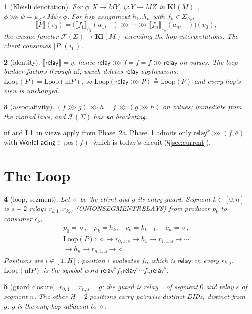 \documentclass[journal]{IEEEtran}
\newcommand{\namedhead}{}
\newtheorem*{namedenv}{\namedhead}
\newenvironment{defD}[2]{\renewcommand{\namedhead}{Definition #1}%
  \begin{namedenv}[#2]}{\end{namedenv}}
\newenvironment{lawL}[2]{\renewcommand{\namedhead}{Law #1}%
  \begin{namedenv}[#2]}{\end{namedenv}}
\newcommand{\sem}[1]{\llbracket #1\rrbracket}
\newcommand{\then}{\mathbin{\ggg}}
\newcommand{\relay}{\mathsf{relay}}
\newcommand{\WF}{\mathsf{WorldFacing}}
\newcommand{\Kl}{\mathbf{Kl}}
\newcommand{\Free}{\mathcal{F}}
\newcommand{\cl}{\diamond}
\newcommand{\nf}{\mathrm{nf}}
\newcommand{\LoopOf}{\mathrm{Loop}}
\newcommand{\pos}{\mathrm{pos}}
\newcommand{\eqd}{\overset{d}{=}}
\DeclareRobustCommand{\code}[1]{{\ttfamily\renewcommand{\_}{\textunderscore\allowbreak}#1}}
\begin{document}
\begin{defD}{D4b}{Kleisli denotation}
For $\phi:X\to MY$, $\psi:Y\to MZ$ in $\Kl(M)$~\cite{Moggi1991},
$\phi\then\psi=\mu_Z\circ M\psi\circ\phi$.  For hop assignment
$h_1..h_n$ with $f_k\in\Sigma_{h_k}$,
\[
\sem{P}(v_0)=\bigl(\sem{f_1}_{h_1}(\bar a_1,-)\then\cdots\then
\sem{f_n}_{h_n}(\bar a_n,-)\bigr)(v_0),
\]
the unique functor $\Free(\Sigma)\to\Kl(M)$ extending the hop
interpretations.  The client consumes $\sem{P}(v_0)$.
\end{defD}

\begin{lawL}{L1}{identity}
$\sem{\relay}=\eta$, hence $\relay\then f=f=f\then\relay$ on values.  The
loop builder factors through $\nf$, which deletes $\relay$ applications:
$\LoopOf(P)=\LoopOf(\nf P)$, so $\LoopOf(\relay\then P)\eqd\LoopOf(P)$ and every
hop's view is unchanged.
\end{lawL}

\begin{lawL}{L2}{associativity}
$(f\then g)\then h=f\then(g\then h)$ on values; immediate from the monad
laws, and $\Free(\Sigma)$ has no bracketing.
\end{lawL}

$\nf$ and L1 on views apply from Phase~2a.  Phase~1 admits only
$\relay^{k}\then(f,\bar a)$ with $\WF\in\pos(f)$, which
is today's circuit (\S\ref{sec:current}).

\section{The Loop}\label{sec:loop}

\begin{defD}{D4c, D5}{loop, segment}
Let $\cl$ be the client and $g$ its entry guard.  Segment $k\in[0,n]$
is $s=2$ relays $r_{k,1}..r_{k,s}$ (\code{ONION\_SEGMENT\_RELAYS}) from producer $p_k$ to consumer $c_k$,
\begin{gather*}
p_0=\cl,\quad p_k=h_k,\quad c_k=h_{k+1},\quad c_n=\cl,\\
\LoopOf(P):\ \cl\to r_{0,1..s}\to h_1\to r_{1,1..s}\to\cdots\\
\to h_n\to r_{n,1..s}\to\cl .
\end{gather*}
Positions are $i\in[1,H]$; position $i$ evaluates $f_i$,
which is $\relay$ on every $r_{k,j}$.  $\LoopOf(\nf P)$ is the symbol word
$\relay^{s}f_1\relay^{s}\cdots f_n\relay^{s}$.
\end{defD}

\begin{lawL}{L7}{guard closure}
$r_{0,1}=r_{n,s}=g$: the guard is relay $1$ of segment $0$ and relay $s$
of segment $n$.  The other $H-2$ positions carry pairwise distinct DIDs,
distinct from $g$.  $g$ is the only hop adjacent to $\cl$.
\end{lawL}
\end{document}
